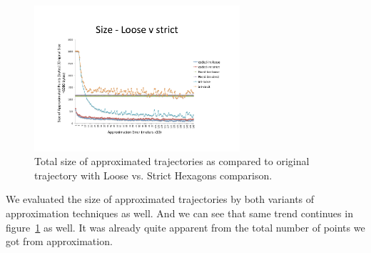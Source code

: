 \documentclass[conference]{IEEEtran}
\begin{document}
  \begin{figure}[h]
  \centering
  \includegraphics[width=3in]{images/total-size-loose-v-strict.pdf}
  \caption {Total size of approximated trajectories as compared to original trajectory with Loose vs. Strict Hexagons comparison.}
  \label{fig:total-storage-loose-strict}
  \end{figure}
  We evaluated the size of approximated trajectories by both variants of approximation techniques as well. And we can see that 
  same trend continues in figure~\ref{fig:total-storage-loose-strict} as well. It was already quite apparent from the total number of 
  points we got from approximation. 
\end{document}
